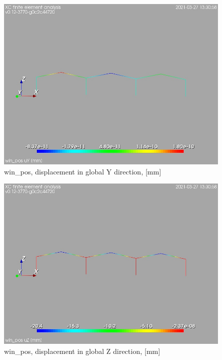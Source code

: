 \begin{figure}
\begin{center}
\includegraphics[width=\linewidth]{calc_results/sole_zeinali/text/graphics/resSimplLC/win_postotaluY}
\caption{win_pos, displacement in global Y direction, [mm]}
\end{center}
\end{figure}
\begin{figure}
\begin{center}
\includegraphics[width=\linewidth]{calc_results/sole_zeinali/text/graphics/resSimplLC/win_postotaluZ}
\caption{win_pos, displacement in global Z direction, [mm]}
\end{center}
\end{figure}
